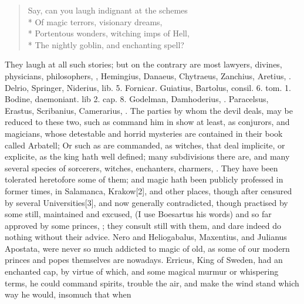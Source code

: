 {{\begin{verse}
Say, can you laugh indignant at the schemes\\*
Of magic terrors, visionary dreams,\\*
Portentous wonders, witching imps of Hell,\\*
The nightly goblin, and enchanting spell?
\end{verse}

They laugh at all such stories; but on the contrary are most lawyers,
divines, physicians, philosophers, \Austin{}, Hemingius, Danaeus,
Chytraeus, Zanchius, Aretius, \etc{}. Delrio, Springer, Niderius,
lib. 5. Fornicar. Guiatius, Bartolus, consil. 6. tom. 1. Bodine,
daemoniant. lib 2. cap. 8. Godelman, Damhoderius, \etc{}. Paracelsus,
Erastus, Scribanius, Camerarius, \etc{}. The parties by whom the devil
deals, may be reduced to these two, such as command him in show at
least, as conjurors, and magicians, whose detestable and horrid
mysteries are contained in their book called Arbatell;  Or
such as are commanded, as witches, that deal  implicite, or
explicite, as the king hath well defined; many subdivisions there
are, and many several species of sorcerers, witches, enchanters,
charmers, \etc{}. They have been tolerated heretofore some of them; and
magic hath been publicly professed in former times, in Salamanca,
Krakow[2\baselineskip], and other places, though after censured by several
Universities[3\baselineskip], and now generally contradicted, though practised by
some still, maintained and excused,  (I
use Boesartus his words) and so far approved by some princes, ; they consult still with them, and dare indeed do nothing
without their advice. Nero and Heliogabalus, Maxentius, and Julianus
Apostata, were never so much addicted to magic of old, as some of our
modern princes and popes themselves are nowadays. Erricus, King of
Sweden, had an enchanted cap, by virtue of which, and some
magical murmur or whispering terms, he could command spirits, trouble
the air, and make the wind stand which way he would, insomuch that when
}}
